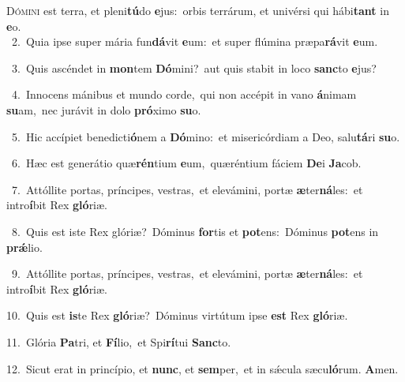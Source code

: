 \lettrine{\initial\textcolor{\initialcolor}{D}}{ómini} est terra, et pleni\-\textbf{tú}\-do \textbf{e}\-jus:~\star orbis terrárum, et univérsi qui hábi\textbf{tant} in \textbf{e}\-o.\\
{\numbfont\textcolor{\numbcolor}{~2.}}~Quia ipse super mária fun\-\textbf{dá}\-vit \textbf{e}\-um:~\star et super flúmina præpa\-\textbf{rá}\-vit \textbf{e}\-um.\par
{\numbfont\textcolor{\numbcolor}{~3.}}~Quis ascéndet in \textbf{mon}\-tem \textbf{Dó}\-mini?~\star aut quis stabit in loco \textbf{sanc}\-to \textbf{e}\-jus?\par
{\numbfont\textcolor{\numbcolor}{~4.}}~Innocens mánibus et mundo corde,~\dagger qui non accépit in vano \textbf{á}\-nimam \textbf{su}\-am,~\star nec jurávit in dolo \textbf{pró}\-ximo \textbf{su}\-o.\par
{\numbfont\textcolor{\numbcolor}{~5.}}~Hic accípiet benedicti\-\textbf{ó}\-nem a \textbf{Dó}\-mino:~\star et misericórdiam a Deo, salu\-\textbf{tá}\-ri \textbf{su}\-o.\par
{\numbfont\textcolor{\numbcolor}{~6.}}~Hæc est generátio quæ\-\textbf{rén}\-tium \textbf{e}\-um,~\star quæréntium fáciem \textbf{De}\-i \textbf{Ja}\-cob.\par
{\numbfont\textcolor{\numbcolor}{~7.}}~Attóllite portas, príncipes, vestras,~\dagger et elevámini, portæ \textbf{æ}\-ter\-\textbf{ná}\-les:~\star et intro\-\textbf{í}\-bit Rex \textbf{gló}\-riæ.\par
{\numbfont\textcolor{\numbcolor}{~8.}}~Quis est iste Rex glóriæ?~\dagger Dóminus \textbf{for}\-tis et \textbf{pot}\-ens:~\star Dóminus \textbf{pot}\-ens in \textbf{prǽ}\-lio.\par
{\numbfont\textcolor{\numbcolor}{~9.}}~Attóllite portas, príncipes, vestras,~\dagger et elevámini, portæ \textbf{æ}\-ter\-\textbf{ná}\-les:~\star et intro\-\textbf{í}\-bit Rex \textbf{gló}\-riæ.\par
{\numbfont\textcolor{\numbcolor}{10.}}~Quis est \textbf{is}\-te Rex \textbf{gló}\-riæ?~\star Dóminus virtútum ipse \textbf{est} Rex \textbf{gló}\-riæ.\par
{\numbfont\textcolor{\numbcolor}{11.}}~Glória \textbf{Pa}\-tri, et \textbf{Fí}\-lio,~\star et Spi\-\textbf{rí}\-tui \textbf{Sanc}\-to.\par
{\numbfont\textcolor{\numbcolor}{12.}}~Sicut erat in princípio, et \textbf{nunc}\-, et \textbf{sem}\-per,~\star et in sǽcula sæcu\-\textbf{ló}\-rum. \textbf{A}\-men.\par
